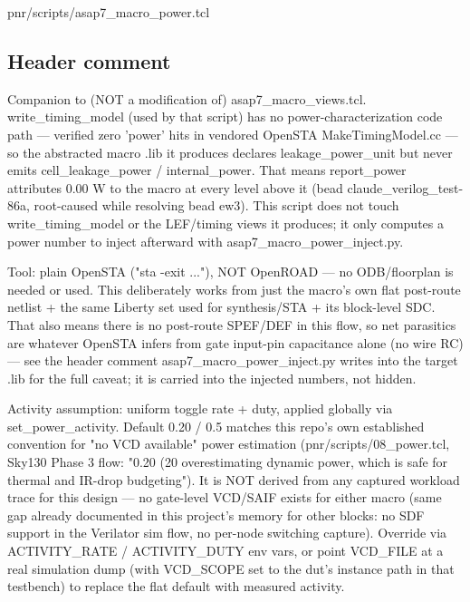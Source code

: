 \begin{relocated}{pnr/scripts/asap7_macro_power.tcl}

\subsection*{Header comment}

\begin{textblock}

Companion to (NOT a modification of) asap7_macro_views.tcl. write_timing_model
(used by that script) has no power-characterization code path — verified
zero 'power' hits in vendored OpenSTA MakeTimingModel.cc — so the abstracted
macro .lib it produces declares leakage_power_unit but never emits
cell_leakage_power / internal_power. That means report_power attributes
0.00 W to the macro at every level above it (bead claude_verilog_test-86a,
root-caused while resolving bead ew3). This script does not touch
write_timing_model or the LEF/timing views it produces; it only computes a
power number to inject afterward with asap7_macro_power_inject.py.

Tool: plain OpenSTA ("sta -exit ..."), NOT OpenROAD — no ODB/floorplan is
needed or used. This deliberately works from just the macro's own flat
post-route netlist + the same Liberty set used for synthesis/STA + its
block-level SDC. That also means there is no post-route SPEF/DEF in this
flow, so net parasitics are whatever OpenSTA infers from gate input-pin
capacitance alone (no wire RC) — see the header comment
asap7_macro_power_inject.py writes into the target .lib for the full
caveat; it is carried into the injected numbers, not hidden.

Activity assumption: uniform toggle rate + duty, applied globally via
set_power_activity. Default 0.20 / 0.5 matches this repo's own established
convention for "no VCD available" power estimation (pnr/scripts/08_power.tcl,
Sky130 Phase 3 flow: "0.20 (20%
overestimating dynamic power, which is safe for thermal and IR-drop
budgeting"). It is NOT derived from any captured workload trace for this
design — no gate-level VCD/SAIF exists for either macro (same gap already
documented in this project's memory for other blocks: no SDF support in the
Verilator sim flow, no per-node switching capture). Override via
ACTIVITY_RATE / ACTIVITY_DUTY env vars, or point VCD_FILE at a real
simulation dump (with VCD_SCOPE set to the dut's instance path in that
testbench) to replace the flat default with measured activity.


\end{textblock}
\end{relocated}
